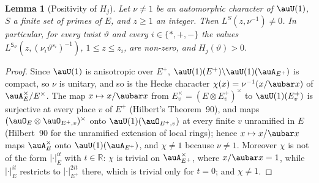 \documentclass[10pt]{amsart}
\newtheorem{lemma}[theorem]{Lemma}
\theoremstyle{definition}
\theoremstyle{remark}
\newcommand{\R}{\mathbb R}
\begin{document}
\begin{lemma}[Positivity of $H_j$]\label{po:Hpos}
Let $\nu\ne1$ be an automorphic character of $\auU(1)$, $S$ a finite set
of primes of $E$, and $z\ge1$ an integer. Then $L^S(z,\nu^{-1})\ne0$. In particular, for every
twist $\vartheta$ and every $i\in\{\ast,+,-\}$ the values $L^{\mathsf S_\vartheta}(z,(\nu_i
\vartheta^{s_i})^{-1})$, $1\le z\le z_i$, are non-zero, and $H_j(\vartheta)>0$.
\end{lemma}
\begin{proof}
Since $\auU(1)$ is anisotropic over $E^+$, $\auU(1)(E^+)\backslash\auU(1)(\auA_{E^+})$ is compact,
so $\nu$ is unitary, and so is the Hecke character $\chi(x)=\nu^{-1}(x/\aubar x)$ of
$\auA_E^\times/E^\times$. The map $x\mapsto x/\aubar x$ from $E_v^\times=(E\otimes E^+_v)^\times$ to
$\auU(1)(E^+_v)$ is surjective at every place $v$ of $E^+$ (Hilbert's Theorem~90), and maps
$(\auO_E\otimes\auO_{E^+,v})^\times$ onto $\auU(1)(\auO_{E^+,v})$ at every finite $v$ unramified in
$E$ (Hilbert~90 for the unramified extension of local rings); hence $x\mapsto x/\aubar x$ maps
$\auA_E^\times$ onto $\auU(1)(\auA_{E^+})$, and $\chi\ne1$ because $\nu\ne1$. Moreover $\chi$ is not of the
form $|\cdot|_E^{it}$ with $t\in\R$: $\chi$ is trivial on $\auA_{E^+}^\times$, where $x/\aubar x=1$, while
$|\cdot|_E^{it}$ restricts to $|\cdot|_{E^+}^{2it}$ there, which is trivial only for $t=0$; and $\chi\ne1$.


\end{proof}
\end{document}
